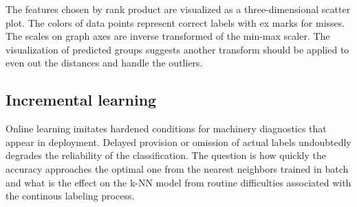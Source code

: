 The features chosen by rank product are visualized as a three-dimensional scatter plot. The colors of data points represent correct labels with ex marks for misses. The scales on graph axes are inverse transformed of the min-max scaler. The visualization of predicted groups suggests another transform should be applied to even out the distances and handle the outliers.


\subsection{Incremental learning}
Online learning imitates hardened conditions for machinery diagnostics that appear in deployment. Delayed provision or omission of actual labels undoubtedly degrades the reliability of the classification. The question is how quickly the accuracy approaches the optimal one from the nearest neighbors trained in batch and what is the effect on the k-NN model from routine difficulties associated with the continous labeling process.

